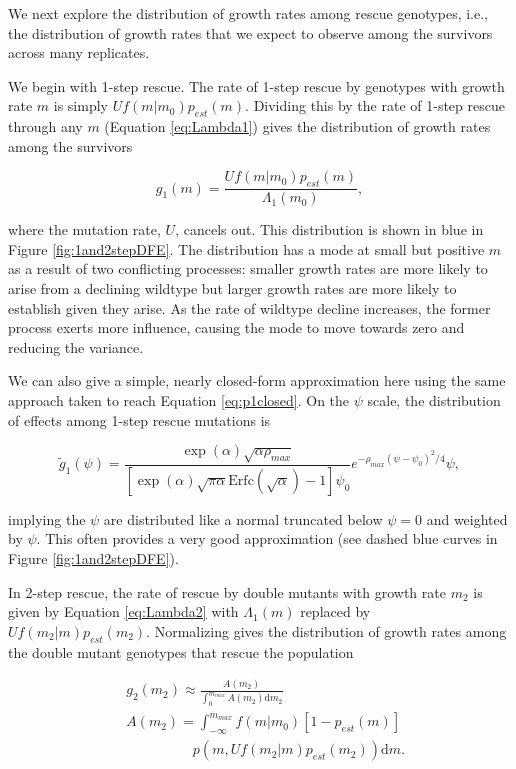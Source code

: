 \documentclass[9pt,twocolumn,twoside,lineno]{gsajnl}
\begin{document}
We next explore the distribution of growth rates among rescue genotypes, i.e., the distribution of growth rates that we expect to observe among the survivors across many replicates.

We begin with 1-step rescue.
The rate of 1-step rescue by genotypes with growth rate $m$ is simply $U f(m|m_0) p_{est}(m)$.
Dividing this by the rate of 1-step rescue through any $m$ (Equation \ref{eq:Lambda1}) gives the distribution of growth rates among the survivors

\begin{equation}\label{eq:g1m}
g_1(m) = \frac{U f(m|m_0) p_{est}(m)}{\Lambda_1(m_0)},
\end{equation}

\noindent where the mutation rate, $U$, cancels out.
This distribution is shown in blue in Figure \ref{fig:1and2stepDFE}.
The distribution has a mode at small but positive $m$ as a result of two conflicting processes: smaller growth rates are more likely to arise from a declining wildtype but larger growth rates are more likely to establish given they arise. 
As the rate of wildtype decline increases, the former process exerts more influence, causing the mode to move towards zero and reducing the variance.

We can also give a simple, nearly closed-form approximation here using the same approach taken to reach Equation \ref{eq:p1closed}.
On the $\psi$ scale, the distribution of effects among 1-step rescue mutations is

\begin{equation}\label{eq:tildeg1m}
\tilde{g}_1(\psi) = \frac{\exp(\alpha)\sqrt{\alpha \rho_{max}}}{[\exp(\alpha)\sqrt{\pi \alpha} \mathrm{Erfc}(\sqrt{\alpha}) - 1]\psi_0} e^{- \rho_{max} (\psi-\psi_0)^2/4} \psi,
\end{equation}

\noindent implying the $\psi$ are distributed like a normal truncated below $\psi=0$ and weighted by $\psi$.
This often provides a very good approximation (see dashed blue curves in Figure \ref{fig:1and2stepDFE}).

In 2-step rescue, the rate of rescue by double mutants with growth rate $m_2$ is given by Equation \ref{eq:Lambda2} with $\Lambda_1(m)$ replaced by $U f(m_2|m) p_{est}(m_2)$.
Normalizing gives the distribution of growth rates among the double mutant genotypes that rescue the population

\begin{equation}\label{eq:g2m}
\begin{aligned}
&g_2(m_2) \approx \frac{A(m_2)}{\int_0^{m_{max}} A(m_2) \mathrm{d}m_2} \\
&A(m_2) = \int_{-\infty}^{m_{max}} f(m|m_0) \left[ 1 - p_{est}(m) \right] \\
&\hspace{2cm}p(m,U f(m_2|m) p_{est}(m_2))\mathrm{d}m.
\end{aligned}
\end{equation}
\end{document}
